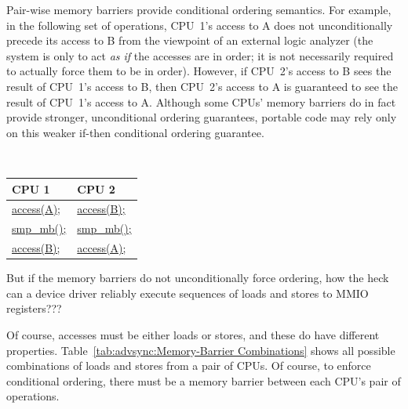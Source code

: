 Pair-wise memory barriers provide conditional ordering semantics.
For example, in the following set of operations, CPU~1's access to
A does not unconditionally precede its access to B from the viewpoint
of an external logic analyzer
	 {(the system is only to act \emph{as if} the accesses
	  are in order; it is not necessarily required to actually
	  force them to be in order).}
However, if CPU~2's access to B sees the result of CPU~1's access
to B, then CPU~2's access to A is guaranteed to see the result of
CPU~1's access to A.
Although some CPUs' memory barriers do in fact provide stronger,
unconditional ordering guarantees, portable code may rely only
on this weaker if-then conditional ordering guarantee.

\vspace{5pt}
\begin{minipage}[t]{\columnwidth}
\tt
\begin{tabular}{l|l}
	CPU 1 &			CPU 2 \\
	\hline
	\url{access(A);} &	\url{access(B);} \\
	\url{smp_mb();} &	\url{smp_mb();} \\
	\url{access(B);} &	\url{access(A);} \\
\end{tabular}
\end{minipage}
\vspace{5pt}

\QuickQuiz{}
	But if the memory barriers do not unconditionally force
	ordering, how the heck can a device driver reliably execute
	sequences of loads and stores to MMIO registers???
 \QuickQuizEnd

Of course, accesses must be either loads or stores, and these
do have different properties.
Table~\ref{tab:advsync:Memory-Barrier Combinations}
shows all possible combinations of loads and stores from a pair
of CPUs.
Of course, to enforce conditional ordering, there must be
a memory barrier between each CPU's pair of operations.

